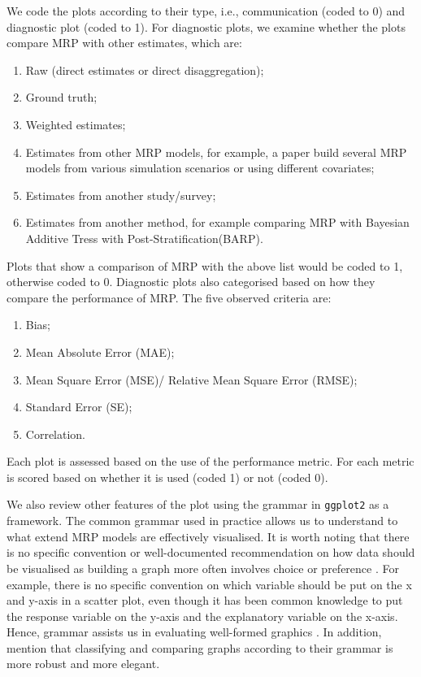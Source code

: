 \documentclass{monashthesis}
\begin{document}
We code the plots according to their type, i.e., communication (coded to 0) and diagnostic plot (coded to 1). For diagnostic plots, we examine whether the plots compare MRP with other estimates, which are:

\begin{enumerate}
\def\labelenumi{\arabic{enumi}.}
\tightlist
\item
  Raw (direct estimates or direct disaggregation);
\item
  Ground truth;
\item
  Weighted estimates;
\item
  Estimates from other MRP models, for example, a paper build several MRP models from various simulation scenarios or using different covariates;
\item
  Estimates from another study/survey;
\item
  Estimates from another method, for example comparing MRP with Bayesian Additive Tress with Post-Stratification(BARP).
\end{enumerate}

Plots that show a comparison of MRP with the above list would be coded to 1, otherwise coded to 0.
Diagnostic plots also categorised based on how they compare the performance of MRP. The five observed criteria are:

\begin{enumerate}
\def\labelenumi{\arabic{enumi}.}
\tightlist
\item
  Bias;
\item
  Mean Absolute Error (MAE);
\item
  Mean Square Error (MSE)/ Relative Mean Square Error (RMSE);
\item
  Standard Error (SE);
\item
  Correlation.
\end{enumerate}

Each plot is assessed based on the use of the performance metric. For each metric is scored based on whether it is used (coded 1) or not (coded 0).

We also review other features of the plot using the grammar in \texttt{ggplot2} \autocite{ggplot2} as a framework. The common grammar used in practice allows us to understand to what extend MRP models are effectively visualised. It is worth noting that there is no specific convention or well-documented recommendation on how data should be visualised as building a graph more often involves choice or preference \autocite{MIDWAY2020100141}. For example, there is no specific convention on which variable should be put on the x and y-axis in a scatter plot, even though it has been common knowledge to put the response variable on the y-axis and the explanatory variable on the x-axis. Hence, grammar assists us in evaluating well-formed graphics \autocite{layered-grammar}. In addition, \textcite{vanderplas} mention that classifying and comparing graphs according to their grammar is more robust and more elegant.
\end{document}

